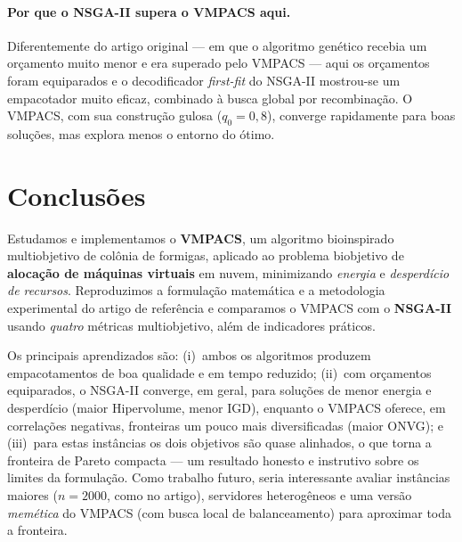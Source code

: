 \documentclass[11pt]{article}
\begin{document}
\paragraph{Por que o NSGA-II supera o VMPACS aqui.} Diferentemente do artigo
original --- em que o algoritmo genético recebia um orçamento muito menor e era
superado pelo VMPACS --- aqui os orçamentos foram equiparados e o decodificador
\emph{first-fit} do NSGA-II mostrou-se um empacotador muito eficaz, combinado à
busca global por recombinação. O VMPACS, com sua construção gulosa
($q_0=0{,}8$), converge rapidamente para boas soluções, mas explora menos o
entorno do ótimo.

\section{Conclusões}
Estudamos e implementamos o \textbf{VMPACS}, um algoritmo bioinspirado
multiobjetivo de colônia de formigas, aplicado ao problema biobjetivo de
\textbf{alocação de máquinas virtuais} em nuvem, minimizando \emph{energia} e
\emph{desperdício de recursos}. Reproduzimos a formulação matemática e a
metodologia experimental do artigo de referência e comparamos o VMPACS com o
\textbf{NSGA-II} usando \emph{quatro} métricas multiobjetivo, além de indicadores
práticos.

Os principais aprendizados são: (i)~ambos os algoritmos produzem empacotamentos
de boa qualidade e em tempo reduzido; (ii)~com orçamentos equiparados, o NSGA-II
converge, em geral, para soluções de menor energia e desperdício (maior
Hipervolume, menor IGD), enquanto o VMPACS oferece, em correlações negativas,
fronteiras um pouco mais diversificadas (maior ONVG); e (iii)~para estas
instâncias os dois objetivos são quase alinhados, o que torna a fronteira de
Pareto compacta --- um resultado honesto e instrutivo sobre os limites da
formulação. Como trabalho futuro, seria interessante avaliar instâncias maiores
($n=2000$, como no artigo), servidores heterogêneos e uma versão \emph{memética} do VMPACS (com busca local de
balanceamento) para aproximar toda a fronteira.
\end{document}
